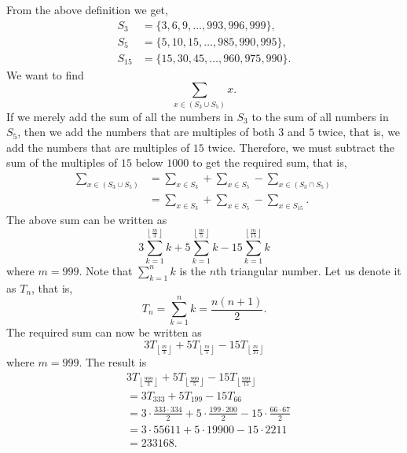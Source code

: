 From the above definition we get,
\begin{align*}
 S_3    & = \{3, 6, 9, \dots, 993, 996, 999\}, \\
 S_5    & = \{5, 10, 15, \dots, 985, 990, 995\}, \\
 S_{15} & = \{15, 30, 45, \dots, 960, 975, 990\}.
\end{align*}
We want to find
\[
    \sum_{x \in (S_3 \cup S_5)} x.
\]
If we merely add the sum of all the numbers in \( S_3 \) to the sum of
all numbers in \( S_5 \), then we add the numbers that are multiples
of both \( 3 \) and \( 5 \) twice, that is, we add the numbers that
are multiples of \( 15 \) twice. Therefore, we must subtract the sum of
the multiples of \( 15 \) below \( 1000 \) to get the required sum, that
is,
\begin{align*}
    \sum_{x \in (S_3 \cup S_5)}
    & = \sum_{x \in S_3} +
        \sum_{x \in S_5} -
        \sum_{x \in (S_3 \cap S_5)} \\
    & = \sum_{x \in S_3} +
        \sum_{x \in S_5} -
        \sum_{x \in S_{15}}.
\end{align*}
The above sum can be written as
\[
    3 \sum_{k=1}^{\left\lfloor \frac{m}{3} \right\rfloor} k +
    5 \sum_{k=1}^{\left\lfloor \frac{m}{5} \right\rfloor} k -
    15 \sum_{k=1}^{\left\lfloor \frac{m}{15} \right\rfloor} k
\]
where \( m = 999 \). Note that \( \sum_{k=1}^n k \) is the \( n \)th
triangular number. Let us denote it as \( T_n \), that is,
\[
T_n = \sum_{k=1}^n k = \frac{n(n + 1)}{2}.
\]
The required sum can now be written as
\[
3 T_{\left\lfloor \frac{m}{3} \right\rfloor} +
5 T_{\left\lfloor \frac{m}{5} \right\rfloor} -
15 T_{\left\lfloor \frac{m}{15} \right\rfloor}
\]
where \( m = 999 \). The result is
\begin{align*}
& 3 T_{\left\lfloor \frac{999}{3} \right\rfloor} +
  5 T_{\left\lfloor \frac{999}{5} \right\rfloor} -
  15 T_{\left\lfloor \frac{999}{15} \right\rfloor} \\
& = 3 T_{333} + 5 T_{199} - 15 T_{66} \\
& = 3 \cdot \frac{333 \cdot 334}{2} +
    5 \cdot \frac{199 \cdot 200}{2} -
    15 \cdot \frac{66 \cdot 67}{2} \\
& = 3 \cdot 55611 + 5 \cdot 19900 - 15 \cdot 2211 \\
& = 233168.
\end{align*}

